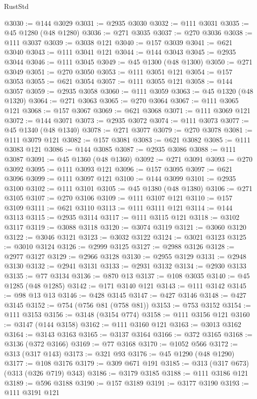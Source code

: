 \begin{lexlean}{RustStd}
\begin{coremodule}
@3030 := @144 @3029
@3031 := @2935 @3030
@3032 := @111 @3031
@3035 := @45 @1280 (@48 @1280)
@3036 := @271 @3035
@3037 := @270 @3036
@3038 := @111 @3037
@3039 := @3038 @121
@3040 := @157 @3039
@3041 := @621 @3040
@3043 := @111 @3041 @121
@3044 := @144 @3043
@3045 := @2935 @3044
@3046 := @111 @3045
@3049 := @45 @1300 (@48 @1300)
@3050 := @271 @3049
@3051 := @270 @3050
@3053 := @111 @3051 @121
@3054 := @157 @3053
@3055 := @621 @3054
@3057 := @111 @3055 @121
@3058 := @144 @3057
@3059 := @2935 @3058
@3060 := @111 @3059
@3063 := @45 @1320 (@48 @1320)
@3064 := @271 @3063
@3065 := @270 @3064
@3067 := @111 @3065 @121
@3068 := @157 @3067
@3069 := @621 @3068
@3071 := @111 @3069 @121
@3072 := @144 @3071
@3073 := @2935 @3072
@3074 := @111 @3073
@3077 := @45 @1340 (@48 @1340)
@3078 := @271 @3077
@3079 := @270 @3078
@3081 := @111 @3079 @121
@3082 := @157 @3081
@3083 := @621 @3082
@3085 := @111 @3083 @121
@3086 := @144 @3085
@3087 := @2935 @3086
@3088 := @111 @3087
@3091 := @45 @1360 (@48 @1360)
@3092 := @271 @3091
@3093 := @270 @3092
@3095 := @111 @3093 @121
@3096 := @157 @3095
@3097 := @621 @3096
@3099 := @111 @3097 @121
@3100 := @144 @3099
@3101 := @2935 @3100
@3102 := @111 @3101
@3105 := @45 @1380 (@48 @1380)
@3106 := @271 @3105
@3107 := @270 @3106
@3109 := @111 @3107 @121
@3110 := @157 @3109
@3111 := @621 @3110
@3113 := @111 @3111 @121
@3114 := @144 @3113
@3115 := @2935 @3114
@3117 := @111 @3115 @121
@3118 := @3102 @3117
@3119 := @3088 @3118
@3120 := @3074 @3119
@3121 := @3060 @3120
@3122 := @3046 @3121
@3123 := @3032 @3122
@3124 := @3021 @3123
@3125 := @3010 @3124
@3126 := @2999 @3125
@3127 := @2988 @3126
@3128 := @2977 @3127
@3129 := @2966 @3128
@3130 := @2955 @3129
@3131 := @2948 @3130
@3132 := @2941 @3131
@3133 := @2931 @3132
@3134 := @2930 @3133
@3135 := @77 @3134
@3136 := @870 @13
@3137 := @108 @3035
@3140 := @45 @1285 (@48 @1285)
@3142 := @171 @3140 @121
@3143 := @111 @3142
@3145 := @98 @13 @13
@3146 := @428 @3145
@3147 := @427 @3146
@3148 := @427 @3145
@3152 := @754 (@756 @81 (@758 @81))
@3153 := @753 @3152
@3154 := @111 @3153
@3156 := @3148 (@3154 @774)
@3158 := @111 @3156 @121
@3160 := @3147 (@144 @3158)
@3162 := @111 @3160 @121
@3163 := @3013 @3162
@3164 := @3143 @3163
@3165 := @3137 @3164
@3166 := @372 @3165
@3168 := @3136 (@372 @3166)
@3169 := @77 @3168
@3170 := @1052 @566
@3172 := @313 (@317 @143)
@3173 := @321 @93
@3176 := @45 @1290 (@48 @1290)
@3177 := @108 @3176
@3179 := @309 @671 @191
@3185 := @313 (@317 @673) (@313 (@326 @719) @343)
@3186 := @3179 @3185
@3188 := @111 @3186 @121
@3189 := @596 @3188
@3190 := @157 @3189
@3191 := @3177 @3190
@3193 := @111 @3191 @121

\end{coremodule}
\end{lexlean}
